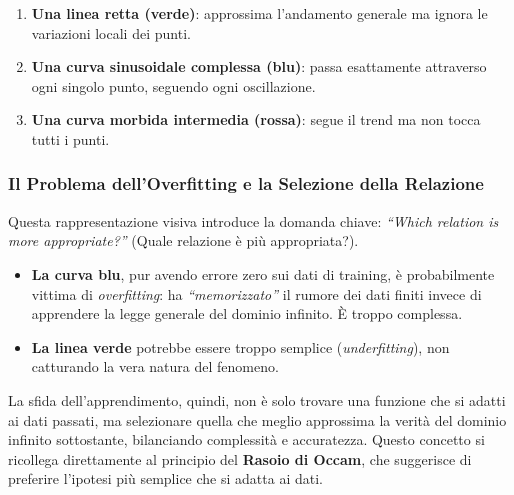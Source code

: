 \begin{enumerate}
    \item \textbf{Una linea retta (verde)}: approssima l'andamento generale 
    ma ignora le variazioni locali dei punti.
    \item \textbf{Una curva sinusoidale complessa (blu)}: passa
    esattamente attraverso ogni singolo punto, seguendo ogni
    oscillazione.
    \item \textbf{Una curva morbida intermedia (rossa)}: segue il trend ma 
    non tocca tutti i punti.
\end{enumerate}

\subsubsection{Il Problema dell'Overfitting e la Selezione della Relazione}

Questa rappresentazione visiva introduce la domanda chiave:
\textit{``Which relation is more appropriate?''} (Quale relazione è più
appropriata?).

\begin{itemize}
    \item \textbf{La curva blu}, pur avendo errore zero sui dati di
    training, è probabilmente vittima di \textit{overfitting}: ha
    \textit{``memorizzato''} il rumore dei dati finiti invece di
    apprendere la legge generale del dominio infinito. È troppo
    complessa.
    \item \textbf{La linea verde} potrebbe essere troppo semplice
    (\textit{underfitting}), non catturando la vera natura del
    fenomeno.
\end{itemize}

La sfida dell'apprendimento, quindi, non è solo trovare una funzione che
si adatti ai dati passati, ma selezionare quella che meglio approssima
la verità del dominio infinito sottostante, bilanciando complessità e
accuratezza. Questo concetto si ricollega direttamente al principio del
\textbf{Rasoio di Occam}, che suggerisce di preferire l'ipotesi più
semplice che si adatta ai dati.
